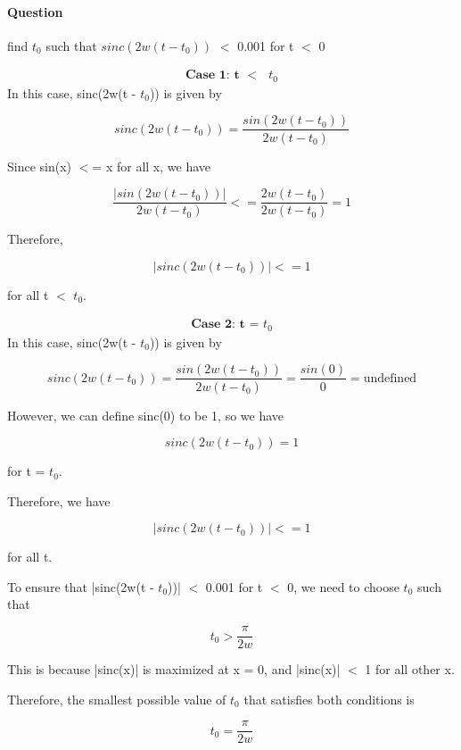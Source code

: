 \documentclass[14pt,a4paper]{report}
\newcounter{question}
\newcommand*\question{%
\stepcounter{question}%
\paragraph{Question \thequestion}}
\begin{document}
\question
{
    find $t_0$ such that $sinc(2w(t - t_0 ))$ $<$ 0.001 for t $<$ 0
}
\begin{answer_box*}

\begin{align}
    \textbf{Case 1: t $<$ $t_0$}
\end{align}
    In this case, sinc(2w(t - $t_0$)) is given by

    $$sinc(2w(t - t_0)) = \frac{sin(2w(t - t_0))}{2w(t - t_0)}$$

    Since sin(x) $<$= x for all x, we have

    $$\frac{|sin(2w(t - t_0))|}{2w(t - t_0)} <= \frac{2w(t - t_0)}{2w(t - t_0)} = 1$$

    Therefore,

    $$|sinc(2w(t - t_0))| <= 1$$

    for all t $<$ $t_0$.

\begin{align}
    \textbf{Case 2: t = $t_0$}
\end{align}
    In this case, sinc(2w(t - $t_0$)) is given by

    $$sinc(2w(t - t_0)) = \frac{sin(2w(t - t_0))}{2w(t - t_0)} = \frac{sin(0)}{0} = \text{undefined}$$

    However, we can define sinc(0) to be 1, so we have

    $$sinc(2w(t - t_0)) = 1$$

    for t = $t_0$.

    Therefore, we have

    $$|sinc(2w(t - t_0))| <= 1$$

    for all t.
    
    To ensure that |sinc(2w(t - $t_0$))| $<$ 0.001 for t $<$ 0, we need to choose $t_0$ such that

    $$t_0 > \frac{\pi}{2w}$$

    This is because |sinc(x)| is maximized at x = 0, and |sinc(x)| $<$ 1 for all other x.

    Therefore, the smallest possible value of $t_0$ that satisfies both conditions is

    $$t_0 = \frac{\pi}{2w}$$
\end{answer_box*}



\end{document}
